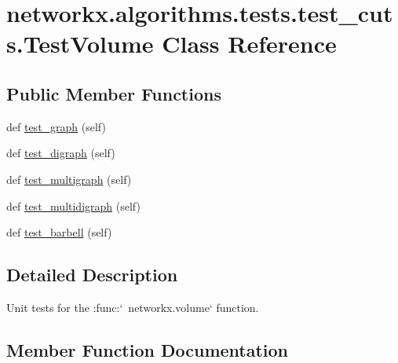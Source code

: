 \hypertarget{classnetworkx_1_1algorithms_1_1tests_1_1test__cuts_1_1TestVolume}{}\section{networkx.\+algorithms.\+tests.\+test\+\_\+cuts.\+Test\+Volume Class Reference}
\label{classnetworkx_1_1algorithms_1_1tests_1_1test__cuts_1_1TestVolume}
\subsection*{Public Member Functions}
\begin{DoxyCompactItemize}
\item 
def \hyperlink{classnetworkx_1_1algorithms_1_1tests_1_1test__cuts_1_1TestVolume_a4b17776bda107193a1aa15dc4e8f4739}{test\+\_\+graph} (self)
\item 
def \hyperlink{classnetworkx_1_1algorithms_1_1tests_1_1test__cuts_1_1TestVolume_a1194ff4021e95edfeee6f26d5666cf81}{test\+\_\+digraph} (self)
\item 
def \hyperlink{classnetworkx_1_1algorithms_1_1tests_1_1test__cuts_1_1TestVolume_a54656798159946d043400de82bc1bc55}{test\+\_\+multigraph} (self)
\item 
def \hyperlink{classnetworkx_1_1algorithms_1_1tests_1_1test__cuts_1_1TestVolume_a2ec50485b90ffde3ec63a178e0e5c919}{test\+\_\+multidigraph} (self)
\item 
def \hyperlink{classnetworkx_1_1algorithms_1_1tests_1_1test__cuts_1_1TestVolume_ad7e423af77cb8c4c981cab9b48cb434a}{test\+\_\+barbell} (self)
\end{DoxyCompactItemize}


\subsection{Detailed Description}
\begin{DoxyVerb}Unit tests for the :func:`~networkx.volume` function.\end{DoxyVerb}
 

\subsection{Member Function Documentation}
\mbox{\label{classnetworkx_1_1algorithms_1_1tests_1_1test__cuts_1_1TestVolume_ad7e423af77cb8c4c981cab9b48cb434a}} 
